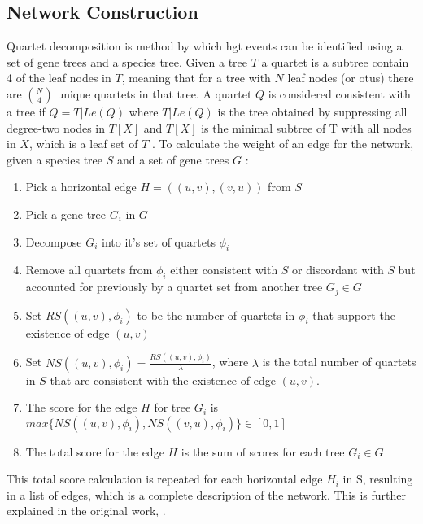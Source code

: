 \subsection{Network Construction}
Quartet decomposition is method by which \ac{hgt} events can be identified using a set of gene trees and a species tree.
Given a tree $T$ a quartet is a subtree contain 4 of the leaf nodes in $T$, meaning that for a tree with $N$ leaf nodes (or \ac{otu}s) there are $\binom{N}{4}$ unique quartets in that tree.
A quartet $Q$ is considered consistent with a tree if $Q = T|Le(Q)$ where $T|Le(Q)$ is the tree obtained by suppressing all degree-two nodes in $T[X]$ and $T[X]$ is the minimal subtree of T with all nodes in $X$, which is a leaf set of $T$ \citep{hide}.
To calculate the weight of an edge for the network, given a species tree $S$ and a set of gene trees $G$ \citep{hide}:
\begin{enumerate}
    \item Pick a horizontal edge $H = ((u,v),(v,u))$ from $S$
    \item Pick a gene tree $G_i$ in $G$
    \item Decompose $G_i$ into it's set of quartets $\phi_i$
    \item Remove all quartets from $\phi_i$ either consistent with $S$ or discordant with $S$ but accounted for previously by a quartet set from another tree $G_j \in G$
    \item Set $RS((u,v),\phi_i)$ to be the number of quartets in $\phi_i$ that support the existence of edge $(u,v)$
    \item Set $NS((u,v),\phi_i) = \frac{RS((u,v),\phi_i)}{\lambda}$, where $\lambda$ is the total number of quartets in $S$ that are consistent with the existence of edge $(u,v)$.
    \item The score for the edge $H$ for tree $G_i$ is $max\{NS((u,v),\phi_i),NS((v,u),\phi_i)\} \in [0,1]$
    \item The total score for the edge $H$ is the sum of scores for each tree $G_i \in G$
\end{enumerate}
This total score calculation is repeated for each horizontal edge $H_i$ in S, resulting in a list of edges, which is a complete description of the network.
This is further explained in the original work, \citep{hide}.
